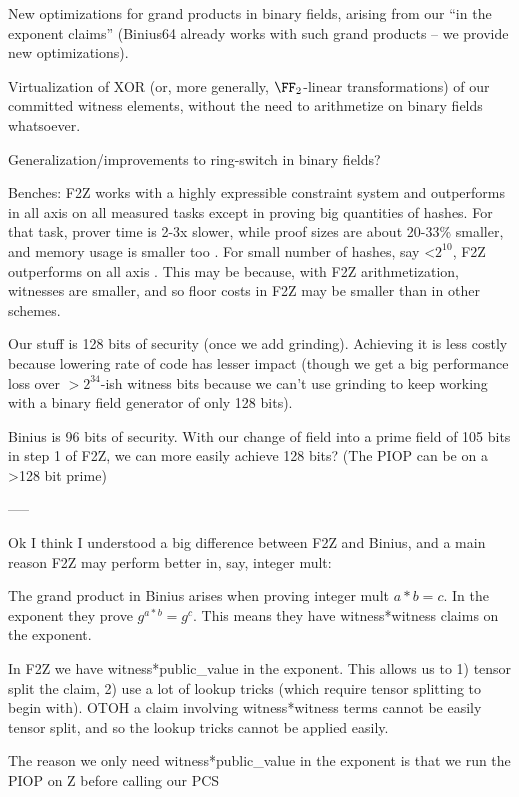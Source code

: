 \documentclass[11pt,letterpaper,usenames,dvipsnames]{article}
\begin{document}
New optimizations for grand products in binary fields, arising from our ``in the exponent claims'' (Binius64 already works with such grand products -- we provide new optimizations). 

Virtualization of XOR (or, more generally, $\FF_2$-linear transformations) of our committed witness elements, without the need to arithmetize on binary fields whatsoever.

Generalization/improvements to ring-switch in binary fields?

Benches: F2Z works with a highly expressible constraint system and outperforms in all axis on all measured tasks except in proving big quantities of hashes. For that task, prover time is 2-3x slower, while proof sizes are about 20-33\% smaller, and memory usage is smaller too . For small number of hashes, say <$2^{10}$, F2Z outperforms on all axis . This may be because, with F2Z arithmetization, witnesses are smaller, and so floor costs in F2Z may be smaller than in other schemes. 

Our stuff is 128 bits of security (once we add grinding). Achieving it is less costly because lowering rate of code has lesser impact (though we get a big performance loss over $>2^{34}$-ish witness bits because we can't use grinding to keep working with a binary field generator of only 128 bits). 

Binius is 96 bits of security. With our change of field into a prime field of 105 bits in step 1 of F2Z, we can more easily achieve 128 bits? (The PIOP can be on a >128 bit prime)

-----

Ok I think I understood a big difference between F2Z and Binius, and a main reason F2Z may perform better in, say, integer mult:

The grand product in Binius arises when proving integer mult $a*b=c$. In the exponent they prove $g^{a*b} = g^c$. This means they have witness*witness claims on the exponent.

In F2Z we have witness*public\_value in the exponent. This allows us to 1) tensor split the claim, 2) use a lot of lookup tricks (which require tensor splitting to begin with). OTOH a claim involving witness*witness terms cannot be easily tensor split, and so the lookup tricks cannot be applied easily.

The reason we only need witness*public\_value in the exponent is that we run the PIOP on Z before calling our PCS
\end{document}
